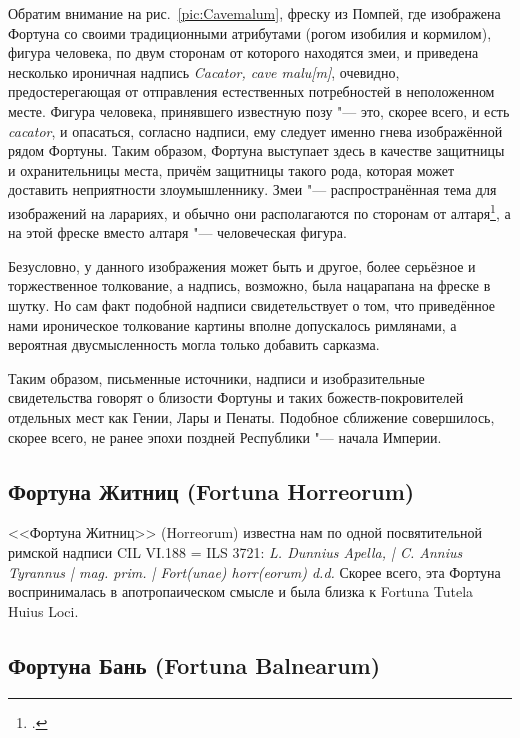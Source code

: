 

Обратим внимание на рис.~\ref{pic:Cavemalum}, фреску из Помпей, где изображена Фортуна со своими традиционными атрибутами (рогом изобилия и кормилом), фигура человека, по двум сторонам от которого находятся змеи, и приведена несколько ироничная надпись \textit{Cacator, cave malu[m]}, очевидно, предостерегающая от отправления естественных потребностей в неположенном месте. Фигура человека, принявшего известную позу "--- это, скорее всего, и есть \textit{cacator}, и опасаться, согласно надписи, ему следует именно гнева изображённой рядом Фортуны. Таким образом, Фортуна выступает здесь в качестве защитницы и охранительницы места, причём защитницы такого рода, которая может доставить неприятности злоумышленнику. Змеи "--- распространённая тема для изображений на ларариях, и обычно они располагаются по сторонам от алтаря\footcite[Pp. 99--100]{ArtePompei1989}, а на этой фреске вместо алтаря "--- человеческая фигура.

Безусловно, у данного изображения может быть и другое, более серьёзное и торжественное толкование, а надпись, возможно, была нацарапана на фреске в шутку. Но сам факт подобной надписи свидетельствует о том, что приведённое нами ироническое толкование картины вполне допускалось римлянами, а вероятная двусмысленность могла только добавить сарказма.


Таким образом, письменные источники, надписи и изобразительные свидетельства говорят о близости Фортуны и таких божеств-покровителей отдельных мест как Гении, Лары и Пенаты. Подобное сближение совершилось, скорее всего, не ранее эпохи поздней Республики "--- начала Империи.

\subsection{Фортуна Житниц (Fortuna Horreorum)}\label{FortunaHorreorum}

<<Фортуна Житниц>> (Horreorum) известна нам по одной посвятительной римской надписи CIL VI.188 = ILS 3721: \textit{L. Dunnius Apella, | C. Annius Tyrannus | mag. prim. | Fort(unae) horr(eorum) d.d.} Скорее всего, эта Фортуна воспринималась в апотропаическом смысле и была близка к Fortuna Tutela Huius Loci.

\subsection{Фортуна Бань (Fortuna Balnearum)}\label{FortunaBalnearum}

